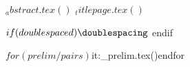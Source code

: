 
\pagestyle{empty}
\singlespacing
$_abstract.tex()$
$_titlepage.tex()$


\pagestyle{plain}  \setcounter{page}{2}

${if(doublespaced)}\doublespacing ${ endif }

${for(prelim/pairs)}
$it:_prelim.tex()$
${endfor}

\cleardoublepage
